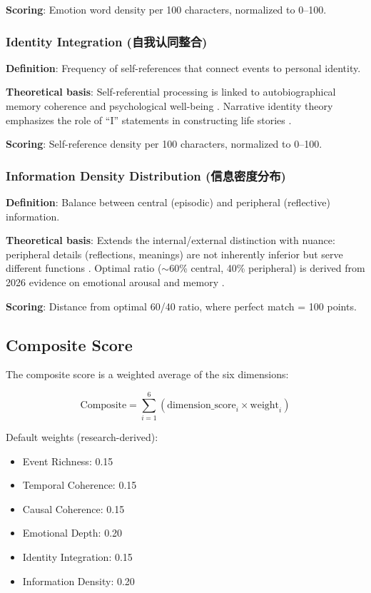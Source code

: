 \documentclass[11pt]{article}
\begin{document}
\textbf{Scoring}: Emotion word density per 100 characters, normalized to 0--100.

\subsubsection{Identity Integration (自我认同整合)}
\textbf{Definition}: Frequency of self-references that connect events to personal identity.

\textbf{Theoretical basis}: Self-referential processing is linked to autobiographical memory coherence and psychological well-being \citep{conway2023}. Narrative identity theory emphasizes the role of ``I'' statements in constructing life stories \citep{mcadams2013}.

\textbf{Scoring}: Self-reference density per 100 characters, normalized to 0--100.

\subsubsection{Information Density Distribution (信息密度分布)}
\textbf{Definition}: Balance between central (episodic) and peripheral (reflective) information.

\textbf{Theoretical basis}: Extends the internal/external distinction with nuance: peripheral details (reflections, meanings) are not inherently inferior but serve different functions \citep{picard2025}. Optimal ratio ($\sim$60\% central, 40\% peripheral) is derived from 2026 evidence on emotional arousal and memory \citep{kensinger2026}.

\textbf{Scoring}: Distance from optimal 60/40 ratio, where perfect match = 100 points.

\subsection{Composite Score}

The composite score is a weighted average of the six dimensions:

\begin{equation}
\text{Composite} = \sum_{i=1}^{6} (\text{dimension\_score}_i \times \text{weight}_i)
\end{equation}

Default weights (research-derived):
\begin{itemize}
    \item Event Richness: 0.15
    \item Temporal Coherence: 0.15
    \item Causal Coherence: 0.15
    \item Emotional Depth: 0.20
    \item Identity Integration: 0.15
    \item Information Density: 0.20
\end{itemize}
\end{document}
